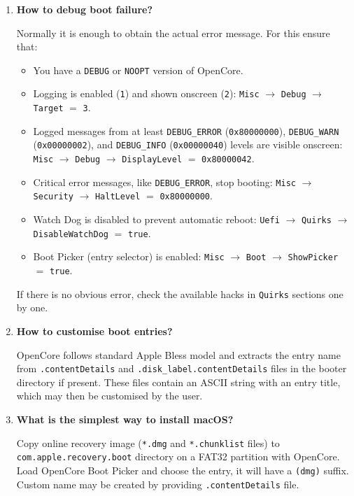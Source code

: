 \documentclass[]{article}
\providecommand{\tightlist}{%
  \setlength{\itemsep}{0pt}\setlength{\parskip}{0pt}}
\begin{document}
\begin{enumerate}
\item
  \textbf{How to debug boot failure?}

  Normally it is enough to obtain the actual error message. For this
  ensure that:
  \begin{itemize}
  \tightlist
  \item You have a \texttt{DEBUG} or \texttt{NOOPT} version of OpenCore.
  \item Logging is enabled (\texttt{1}) and shown onscreen (\texttt{2}):
  \texttt{Misc} $\rightarrow$ \texttt{Debug} $\rightarrow$ \texttt{Target}
  $=$ \texttt{3}.
  \item Logged messages from at least \texttt{DEBUG\_ERROR}
  (\texttt{0x80000000}), \texttt{DEBUG\_WARN} (\texttt{0x00000002}), and
  \texttt{DEBUG\_INFO} (\texttt{0x00000040}) levels are visible onscreen:
  \texttt{Misc} $\rightarrow$ \texttt{Debug} $\rightarrow$ \texttt{DisplayLevel}
  $=$ \texttt{0x80000042}.
  \item Critical error messages, like \texttt{DEBUG\_ERROR}, stop booting:
  \texttt{Misc} $\rightarrow$ \texttt{Security}
  $\rightarrow$ \texttt{HaltLevel} $=$ \texttt{0x80000000}.
  \item Watch Dog is disabled to prevent automatic reboot:
  \texttt{Uefi} $\rightarrow$ \texttt{Quirks} $\rightarrow$
  \texttt{DisableWatchDog} $=$ \texttt{true}.
  \item Boot Picker (entry selector) is enabled: \texttt{Misc}
  $\rightarrow$ \texttt{Boot} $\rightarrow$ \texttt{ShowPicker} $=$ \texttt{true}.
  \end{itemize}

  If there is no obvious error, check the available hacks in \texttt{Quirks} sections
  one by one.

\item
  \textbf{How to customise boot entries?}

  OpenCore follows standard Apple Bless model and extracts the entry name
  from \texttt{.contentDetails} and \texttt{.disk\_label.contentDetails} files in the
  booter directory if present. These files contain an ASCII string with an entry title,
  which may then be customised by the user.

\item
  \textbf{What is the simplest way to install macOS?}

  Copy online recovery image (\texttt{*.dmg} and \texttt{*.chunklist} files)
  to \texttt{com.apple.recovery.boot} directory on a FAT32 partition with OpenCore.
  Load OpenCore Boot Picker and choose the entry, it will have a \texttt{(dmg)} suffix.
  Custom name may be created by providing \texttt{.contentDetails} file.


\end{enumerate}
\end{document}
